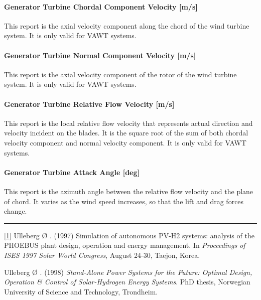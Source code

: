 \paragraph{Generator Turbine Chordal Component Velocity {[}m/s{]}}\label{generator-turbine-chordal-component-velocity-ms}

This report is the axial velocity component along the chord of the wind turbine system. It is only valid for VAWT systems.

\paragraph{Generator Turbine Normal Component Velocity {[}m/s{]}}\label{generator-turbine-normal-component-velocity-ms}

This report is the axial velocity component of the rotor of the wind turbine system. It is only valid for VAWT systems.

\paragraph{Generator Turbine Relative Flow Velocity {[}m/s{]}}\label{generator-turbine-relative-flow-velocity-ms}

This report is the local relative flow velocity that represents actual direction and velocity incident on the blades. It is the square root of the sum of both chordal velocity component and normal velocity component. It is only valid for VAWT systems.

\paragraph{Generator Turbine Attack Angle {[}deg{]}}\label{generator-turbine-attack-angle-deg}

This report is the azimuth angle between the relative flow velocity and the plane of chord. It varies as the wind speed increases, so that the lift and drag forces change.

\begin{center}\rule{0.5\linewidth}{\linethickness}\end{center}

\protect\hyperlink{ux5fftnref1}{{[}1{]}} Ulleberg Ø . (1997) Simulation of autonomous PV-H2 systems: analysis of the PHOEBUS plant design, operation and energy management. In \emph{Proceedings of ISES 1997 Solar World Congress}, August 24-30, Taejon, Korea.

Ulleberg Ø . (1998) \emph{Stand-Alone Power Systems for the Future: Optimal Design, Operation \& Control of Solar-Hydrogen Energy Systems}. PhD thesis, Norwegian University of Science and Technology, Trondheim.
